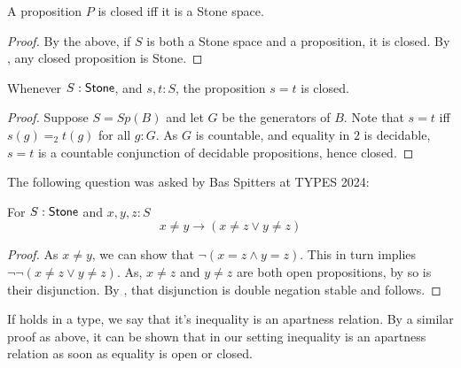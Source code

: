 \begin{corollary}\label{PropositionsClosedIffStone}
  A proposition $P$ is closed iff it is a Stone space. 
\end{corollary}
\begin{proof}
  By the above, if $S$ is both a Stone space and a proposition, it is closed. 
  By , any closed proposition is Stone. 
\end{proof}

\begin{lemma}\label{StoneEqualityClosed}
  Whenever $S:\mathsf{Stone}$, and $s,t:S$, the proposition $s=t$ is closed. 
\end{lemma}
\begin{proof}
  Suppose $S= Sp(B)$ and let $G$ be the generators of $B$. 
  Note that $s=t$ iff $s(g) =_2 t(g)$ for all $g:G$. 
  As $G$ is countable, and equality in $2$ is decidable, 
  $s=t$ is a countable conjunction of decidable propositions, hence 
  closed. 
\end{proof}
%
The following question was asked by Bas Spitters at TYPES 2024:
\begin{corollary}
  For $S:\mathsf{Stone}$ and $x,y,z:S$ 
  \begin{equation}\label{Apartness}
  x \neq y \to (x\neq z \vee y \neq z)
  \end{equation}
\end{corollary}
\begin{proof}
  As $x\neq y$, we can show that $\neg ( x = z \wedge y = z)$. 
  This in turn implies $\neg \neg ( x \neq  z \vee y \neq  z)$. 
  As, $x\neq z$ and $y \neq z$ are both open propositions, by  so is their disjunction. 
  By , that disjunction is double negation stable and  follows. 
\end{proof}
\begin{remark}
  If  holds in a type, we say that it's inequality is an apartness relation. 
  By a similar proof as above, it can be shown that in our setting inequality is an apartness relation 
  as soon as equality is open or closed. 
\end{remark}
